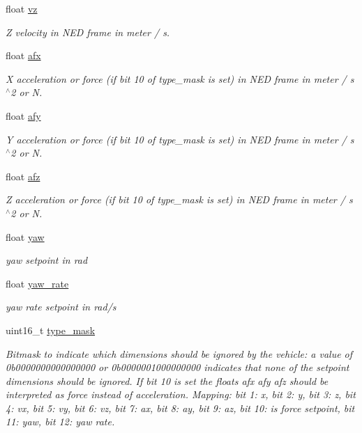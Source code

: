 \begin{DoxyCompactItemize}
float \hyperlink{struct____mavlink__set__position__target__global__int__t_a8c2ae26a6e3798c7cf4420ae73d63799}{vz}
\begin{DoxyCompactList}\small\item\em Z velocity in N\+E\+D frame in meter / s. \end{DoxyCompactList}\item 
float \hyperlink{struct____mavlink__set__position__target__global__int__t_ac35a1928d17680654f3342905ae2755e}{afx}
\begin{DoxyCompactList}\small\item\em X acceleration or force (if bit 10 of type\+\_\+mask is set) in N\+E\+D frame in meter / s$^\wedge$2 or N. \end{DoxyCompactList}\item 
float \hyperlink{struct____mavlink__set__position__target__global__int__t_a3e2deef7e0f011c0dffebd22791b2830}{afy}
\begin{DoxyCompactList}\small\item\em Y acceleration or force (if bit 10 of type\+\_\+mask is set) in N\+E\+D frame in meter / s$^\wedge$2 or N. \end{DoxyCompactList}\item 
float \hyperlink{struct____mavlink__set__position__target__global__int__t_ae423776f7a77472cc436b8bce2e3e987}{afz}
\begin{DoxyCompactList}\small\item\em Z acceleration or force (if bit 10 of type\+\_\+mask is set) in N\+E\+D frame in meter / s$^\wedge$2 or N. \end{DoxyCompactList}\item 
float \hyperlink{struct____mavlink__set__position__target__global__int__t_a90f00b091abf9c2c2c72df71d156468e}{yaw}
\begin{DoxyCompactList}\small\item\em yaw setpoint in rad \end{DoxyCompactList}\item 
float \hyperlink{struct____mavlink__set__position__target__global__int__t_a672c17866b8d76e8710ca86551117a00}{yaw\+\_\+rate}
\begin{DoxyCompactList}\small\item\em yaw rate setpoint in rad/s \end{DoxyCompactList}\item 
uint16\+\_\+t \hyperlink{struct____mavlink__set__position__target__global__int__t_ad53f416128a22a21de85e3e68545f149}{type\+\_\+mask}
\begin{DoxyCompactList}\small\item\em Bitmask to indicate which dimensions should be ignored by the vehicle\+: a value of 0b0000000000000000 or 0b0000001000000000 indicates that none of the setpoint dimensions should be ignored. If bit 10 is set the floats afx afy afz should be interpreted as force instead of acceleration. Mapping\+: bit 1\+: x, bit 2\+: y, bit 3\+: z, bit 4\+: vx, bit 5\+: vy, bit 6\+: vz, bit 7\+: ax, bit 8\+: ay, bit 9\+: az, bit 10\+: is force setpoint, bit 11\+: yaw, bit 12\+: yaw rate. \end{DoxyCompactList}\item 

\end{DoxyCompactItemize}
